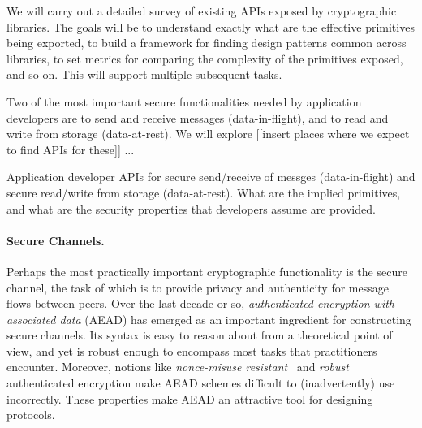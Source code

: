 \begin{task}
  We will carry out a detailed survey of existing APIs exposed by
  cryptographic libraries. The goals will be to understand exactly
  what are the effective primitives being exported, to build a
  framework for finding design patterns common across libraries,
  to set metrics for comparing the complexity of the primitives
  exposed, and so on. This will support multiple subsequent
  tasks.
\end{task}

Two of the most important secure functionalities needed by application
developers are to send and receive messages (data-in-flight), and to
read and write from storage (data-at-rest).  We will explore [[insert
places where we expect to find APIs for these]] ...

\begin{task}
Application developer APIs for secure send/receive of messges
(data-in-flight) and secure read/write from storage (data-at-rest).  What are
the implied primitives, and what are the security properties that developers
assume are provided.
\end{task}



\paragraph{Secure Channels. }
Perhaps the most practically important cryptographic functionality is the
secure channel, the task of which is to provide privacy and authenticity for
message flows between peers.
%
Over the last decade or so, \emph{authenticated encryption with associated data}
(AEAD) has emerged as an important ingredient for constructing secure channels.
%
Its syntax is easy to reason about from a theoretical point of view, and yet is
robust enough to encompass most tasks that practitioners encounter. Moreover,
notions like \emph{nonce-misuse resistant}~\cite{RS06} and
\emph{robust}~\cite{HKR15} authenticated encryption make AEAD schemes difficult
to (inadvertently) use incorrectly. These properties make AEAD an attractive
tool for designing protocols.

